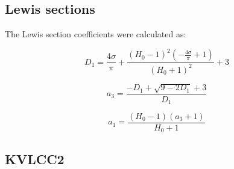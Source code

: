     \subsection{Lewis sections}\label{lewis-sections}

    The Lewis section coefficients were calculated as:
 
            
    
    \begin{equation}
D_{1} = \frac{4 \sigma}{\pi} + \frac{\left(H_{0} - 1\right)^{2} \left(- \frac{4 \sigma}{\pi} + 1\right)}{\left(H_{0} + 1\right)^{2}} + 3
\label{eq:equation}
\end{equation}

    
 
            
    
    \begin{equation}
a_{3} = \frac{- D_{1} + \sqrt{9 - 2 D_{1}} + 3}{D_{1}}
\label{eq:equation}
\end{equation}

    
 
            
    
    \begin{equation}
a_{1} = \frac{\left(H_{0} - 1\right) \left(a_{3} + 1\right)}{H_{0} + 1}
\label{eq:equation}
\end{equation}

    

    \subsection{KVLCC2}\label{kvlcc2}
 
            
    
